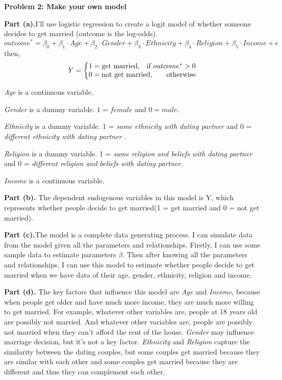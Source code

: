 \documentclass[letterpaper,12pt]{article}
\theoremstyle{definition}
\begin{document}
\noindent\textbf{Problem 2: Make your own model}

\textbf{Part (a).}I'll use logistic regression to create a logit model of whether someone decides to get married (outcome is the log-odds).
\begin{equation*}
outcome^{*}=\beta _{0} + \beta _{1}\cdot Age + \beta _{2}\cdot Gender + \beta _{3}\cdot Ethnicity + \beta _{4}\cdot Religion +  \beta _{5}\cdot Income + \epsilon
\end{equation*}
then,
\begin{equation*}
Y = \left\{\begin{matrix}
1=\textup{get married,} \quad\textup{if } outcome^{*}> 0 \\ 0=\textup{not get married,}\qquad\textup{otherwise} 
\end{matrix}\right.
\end{equation*}

\emph{Age} is a continuous variable. 

\emph{Gender} is a dummy variable. $1 = female$ and $0 = male$.  

\emph{Ethnicity } is a dummy variable.  1 = \emph{same ethnicity with dating partner} and  0 = \emph{different ethnicity with dating partner }. 

\emph{Religion} is a dummy variable.  1 = \emph{same religion and beliefs with dating partner} and 0 = \emph{different religion and beliefs with dating partner}. 

\emph{Income} is a continuous variable.

\textbf{Part (b).} The dependent endogenous variables in this model is Y, which represents whether people decide to get married(1 = get married and 0 = not get married).

\textbf{Part (c).}The model is a complete data generating process. I can simulate data from the model given all the parameters and relationships. Firstly, I can use some sample data to estimate parameters $\beta$. Then after knowing all the parameters and relationships, I can use this model to estimate whether people decide to get married when we have data of their age, gender, ethnicity, religion and income.

\textbf{Part (d).} The key factors that influence this model are \emph{Age} and \emph{Income}, because when people get older and have much more income, they are much more willing to get married. For example, whatever other variables are, people at 18 years old are possibly not married. And whatever other variables are, people are possibly not married when they can't afford the rent of the house. \emph{Gender} may influence marriage decision, but it's not a key factor. \emph{Ethnicity} and \emph{Religion} capture the similarity between the dating couples, but some couples get married because they are similar with each other and some couples get married because they are different and thus they can complement each other.
\end{document}
